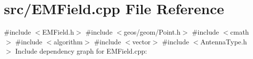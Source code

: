 \section{src/\+E\+M\+Field.cpp File Reference}
\label{_e_m_field_8cpp}
{\ttfamily \#include $<$E\+M\+Field.\+h$>$}\newline
{\ttfamily \#include $<$geos/geom/\+Point.\+h$>$}\newline
{\ttfamily \#include $<$cmath$>$}\newline
{\ttfamily \#include $<$algorithm$>$}\newline
{\ttfamily \#include $<$vector$>$}\newline
{\ttfamily \#include $<$Antenna\+Type.\+h$>$}\newline
Include dependency graph for E\+M\+Field.\+cpp\+:
